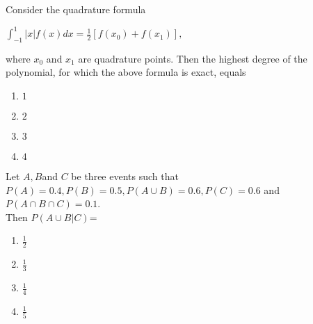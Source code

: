 \iffalse
\title{"2007-MA-(52-68)"}
\author{EE24BTECH11014 - Deepak }
\section{ma}
\chapter{2007}
\fi



    \item Consider the quadrature formula 
    \begin{center}
        $\int_{-1}^{1}|x|f(x)dx=\frac{1}{2}[f(x_{0})+f(x_{1})],$ 
    \end{center}
            
            where $x_0$ and $x_1$ are quadrature points. Then the highest degree of the polynomial, for which the above formula is exact, equals
        
            \begin{multicols}{4}
            \begin{enumerate}
                \item $1$
                \item $2$
                \item $3$
                \item $4$
            \end{enumerate}
            \end{multicols}
            
                \item Let $A,B $and $C$ be three events such that\\
                $P(A)=0.4,P(B)=0.5,P(A\cup B)=0.6,P(C)=0.6$ and $P(A\cap B\cap C)=0.1$. \\
                Then $P(A\cup B|C)$=
                \begin{multicols}{4}
                \begin{enumerate}
                    \item $\frac{1}{2}$
                    \item $\frac{1}{3}$
                    \item $\frac{1}{4}$
                    \item $\frac{1}{5}$
                \end{enumerate}
                \end{multicols}

